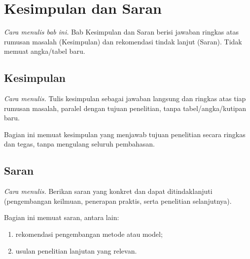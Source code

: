 \chapter{Kesimpulan dan Saran}
\emph{Cara menulis bab ini.} Bab Kesimpulan dan Saran berisi jawaban ringkas atas rumusan masalah (Kesimpulan) dan rekomendasi tindak lanjut (Saran). Tidak memuat angka/tabel baru.


\section{Kesimpulan}
\emph{Cara menulis.} Tulis kesimpulan sebagai jawaban langsung dan ringkas atas tiap rumusan masalah, paralel dengan tujuan penelitian, tanpa tabel/angka/kutipan baru.

Bagian ini memuat kesimpulan yang menjawab tujuan penelitian secara ringkas dan
tegas, tanpa mengulang seluruh pembahasan.

\section{Saran}
\emph{Cara menulis.} Berikan saran yang konkret dan dapat ditindaklanjuti (pengembangan keilmuan, penerapan praktis, serta penelitian selanjutnya).

Bagian ini memuat saran, antara lain:
\begin{enumerate}[leftmargin=*]
  \item rekomendasi pengembangan metode atau model;
  \item usulan penelitian lanjutan yang relevan.
\end{enumerate}
